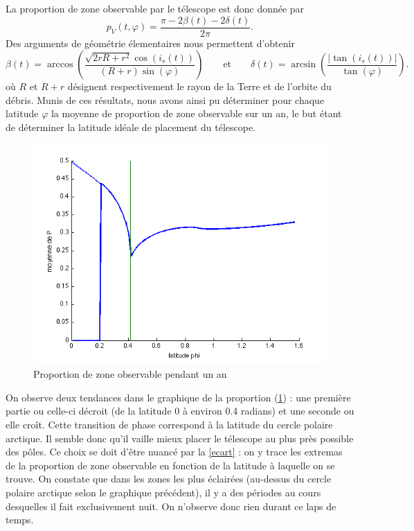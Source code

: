 \documentclass[a4paper,11pt]{article}
\numberwithin{section}{part}
\begin{document}
La proportion de zone observable par le t\'elescope est donc donn\'ee par 
\[{p_{V}(t,\varphi)=\frac{\pi-2\beta(t)-2\delta(t)}{2\pi}}.\]
Des arguments de g\'eom\'etrie \'elementaires  nous permettent d'obtenir
\[ \beta(t)=\arccos\left(\frac{\sqrt{2rR+r^2}\cos(i_s(t))}{(R+r)\sin(\varphi)}\right) \qquad \text{et} \qquad \delta(t)=\arcsin\left(\frac{|\tan(i_s(t))|}{\tan(\varphi)}\right).\]
 o\`u $R$ et $R+r$ d\'esignent respectivement le rayon de la Terre et de l'orbite du d\'ebris.
Munis de ces r\'esultats,  nous avons ainsi pu d\'eterminer pour chaque latitude $\varphi$ la moyenne de proportion de zone observable sur un an, le but \'etant de d\'eterminer la latitude id\'eale de placement du t\'elescope. 

 \begin{figure}[ht]
    \centering
    \includegraphics[width=.7\textwidth]{opt.png}
    \caption{Proportion de zone observable pendant un an}\label{opt}
 \end{figure}
 
 On observe deux tendances dans le graphique de la proportion (\ref{opt}) : une premi\`ere partie ou celle-ci d\'ecroit (de la latitude $0$ \`a environ 0.4 radians) et une seconde ou elle cro\^it. Cette transition de phase correspond \`a la latitude du cercle polaire arctique. Il semble donc qu'il vaille mieux placer le t\'elescope au plus pr\`es possible des p\^oles.
 Ce choix se doit d'\^etre nuanc\'e par la \autoref{ecart} : on y trace les extremas de la proportion de zone observable en fonction de la latitude \`a laquelle on se trouve.
 On constate que dans les zones les plus \'eclair\'ees (au-dessus du cercle polaire arctique selon le graphique pr\'ec\'edent), il y a des p\'eriodes au cours desquelles il fait exclusivement nuit.
 On n'observe donc rien durant ce laps de temps.
 
\end{document}

